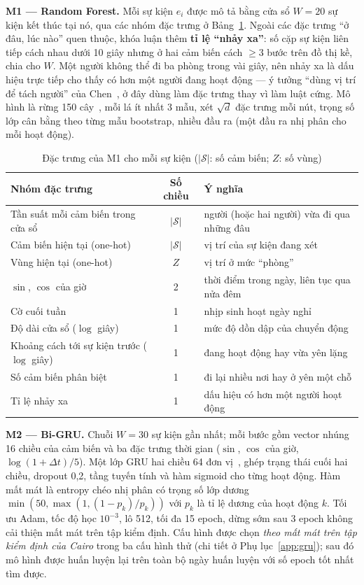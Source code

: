 \textbf{M1 --- Random Forest.} Mỗi sự kiện $e_i$ được mô tả bằng cửa sổ $W = 20$ sự kiện kết thúc tại
nó, qua các nhóm đặc trưng ở Bảng~\ref{tab:features}. Ngoài các đặc trưng ``ở đâu, lúc nào'' quen thuộc,
khóa luận thêm \textbf{tỉ lệ ``nhảy xa''}: số cặp sự kiện liên tiếp cách nhau dưới 10 giây nhưng ở hai cảm
biến cách $\ge 3$ bước trên đồ thị kề, chia cho $W$. Một người không thể đi ba phòng trong vài giây, nên
nhảy xa là dấu hiệu trực tiếp cho thấy có hơn một người đang hoạt động --- ý tưởng ``dùng vị trí để tách
người'' của Chen~\cite{chen2021fcmcpd}, ở đây dùng làm đặc trưng thay vì làm luật cứng. Mô hình là rừng 150
cây~\cite{breiman2001rf}, mỗi lá ít nhất 3 mẫu, xét $\sqrt d$ đặc trưng mỗi nút, trọng số lớp cân bằng theo
từng mẫu bootstrap, nhiều đầu ra (một đầu ra nhị phân cho mỗi hoạt động).

\begin{table}[htbp]
\centering
\caption{Đặc trưng của M1 cho mỗi sự kiện ($|\mathcal S|$: số cảm biến; $Z$: số vùng)}
\label{tab:features}
\small
\begin{tabular}{p{5.2cm}cp{7.2cm}}
\toprule
Nhóm đặc trưng & Số chiều & Ý nghĩa \\
\midrule
Tần suất mỗi cảm biến trong cửa sổ & $|\mathcal S|$ & người (hoặc hai người) vừa đi qua những đâu \\
Cảm biến hiện tại (one-hot) & $|\mathcal S|$ & vị trí của sự kiện đang xét \\
Vùng hiện tại (one-hot) & $Z$ & vị trí ở mức ``phòng'' \\
$\sin$, $\cos$ của giờ & 2 & thời điểm trong ngày, liên tục qua nửa đêm \\
Cờ cuối tuần & 1 & nhịp sinh hoạt ngày nghỉ \\
Độ dài cửa sổ ($\log$ giây) & 1 & mức độ dồn dập của chuyển động \\
Khoảng cách tới sự kiện trước ($\log$ giây) & 1 & đang hoạt động hay vừa yên lặng \\
Số cảm biến phân biệt & 1 & đi lại nhiều nơi hay ở yên một chỗ \\
Tỉ lệ nhảy xa & 1 & dấu hiệu có hơn một người hoạt động \\
\bottomrule
\end{tabular}
\end{table}

\textbf{M2 --- Bi-GRU.} Chuỗi $W = 30$ sự kiện gần nhất; mỗi bước gồm vector nhúng 16 chiều của cảm
biến và ba đặc trưng thời gian ($\sin$, $\cos$ của giờ, $\log(1+\Delta t)/5$). Một lớp GRU hai chiều
64 đơn vị~\cite{cho2014gru,schuster1997brnn}, ghép trạng thái cuối hai chiều, dropout 0,2, tầng tuyến
tính và hàm sigmoid cho từng hoạt động. Hàm mất mát là entropy chéo nhị phân có trọng số lớp dương
$\min(50, \max(1, (1-p_k)/p_k))$ với $p_k$ là tỉ lệ dương của hoạt động $k$. Tối ưu Adam, tốc độ học
$10^{-3}$, lô 512, tối đa 15 epoch, dừng sớm sau 3 epoch không cải thiện mất mát trên tập kiểm định.
Cấu hình được chọn \emph{theo mất mát trên tập kiểm định của Cairo} trong ba cấu hình thử (chi tiết
ở Phụ lục~\ref{app:gru}); sau đó mô hình được huấn luyện lại trên toàn bộ ngày huấn luyện với số epoch
tốt nhất tìm được.

